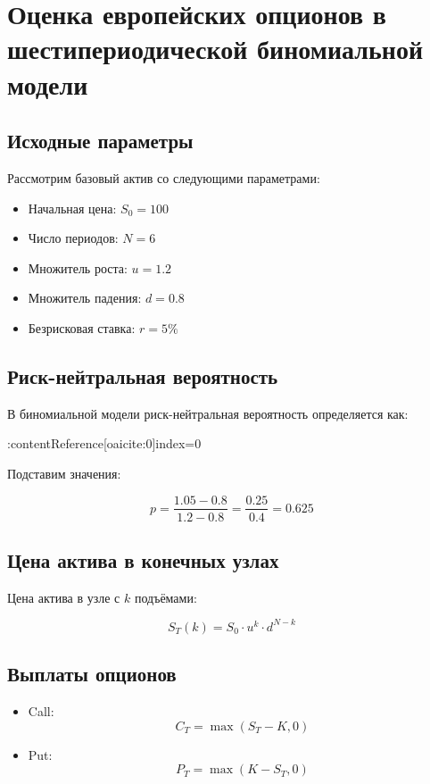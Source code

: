 \section*{Оценка европейских опционов в шестипериодической биномиальной модели}

\subsection*{Исходные параметры}

Рассмотрим базовый актив со следующими параметрами:
\begin{itemize}
    \item Начальная цена: $S_0 = 100$
    \item Число периодов: $N = 6$
    \item Множитель роста: $u = 1.2$
    \item Множитель падения: $d = 0.8$
    \item Безрисковая ставка: $r = 5\%$
\end{itemize}

\subsection*{Риск-нейтральная вероятность}

В биномиальной модели риск-нейтральная вероятность определяется как:

:contentReference[oaicite:0]{index=0}

Подставим значения:

\[
p = \frac{1.05 - 0.8}{1.2 - 0.8} = \frac{0.25}{0.4} = 0.625
\]

\subsection*{Цена актива в конечных узлах}

Цена актива в узле с $k$ подъёмами:

\[
S_T(k) = S_0 \cdot u^k \cdot d^{N-k}
\]

\subsection*{Выплаты опционов}

\begin{itemize}
    \item Call:
    \[
    C_T = \max(S_T - K, 0)
    \]
    \item Put:
    \[
    P_T = \max(K - S_T, 0)
    \]
\end{itemize}

